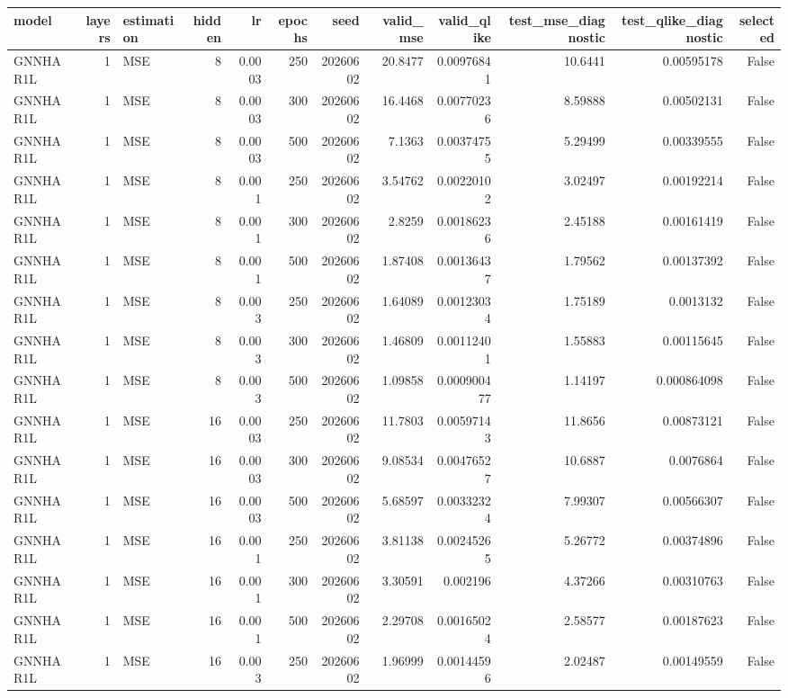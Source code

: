 \begin{tabular}{lrlrrrrrrrrr}
\toprule
model & layers & estimation & hidden & lr & epochs & seed & valid_mse & valid_qlike & test_mse_diagnostic & test_qlike_diagnostic & selected \\
\midrule
GNNHAR1L & 1 & MSE & 8 & 0.0003 & 250 & 20260602 & 20.8477 & 0.00976841 & 10.6441 & 0.00595178 & False \\
GNNHAR1L & 1 & MSE & 8 & 0.0003 & 300 & 20260602 & 16.4468 & 0.00770236 & 8.59888 & 0.00502131 & False \\
GNNHAR1L & 1 & MSE & 8 & 0.0003 & 500 & 20260602 & 7.1363 & 0.00374755 & 5.29499 & 0.00339555 & False \\
GNNHAR1L & 1 & MSE & 8 & 0.001 & 250 & 20260602 & 3.54762 & 0.00220102 & 3.02497 & 0.00192214 & False \\
GNNHAR1L & 1 & MSE & 8 & 0.001 & 300 & 20260602 & 2.8259 & 0.00186236 & 2.45188 & 0.00161419 & False \\
GNNHAR1L & 1 & MSE & 8 & 0.001 & 500 & 20260602 & 1.87408 & 0.00136437 & 1.79562 & 0.00137392 & False \\
GNNHAR1L & 1 & MSE & 8 & 0.003 & 250 & 20260602 & 1.64089 & 0.00123034 & 1.75189 & 0.0013132 & False \\
GNNHAR1L & 1 & MSE & 8 & 0.003 & 300 & 20260602 & 1.46809 & 0.00112401 & 1.55883 & 0.00115645 & False \\
GNNHAR1L & 1 & MSE & 8 & 0.003 & 500 & 20260602 & 1.09858 & 0.000900477 & 1.14197 & 0.000864098 & False \\
GNNHAR1L & 1 & MSE & 16 & 0.0003 & 250 & 20260602 & 11.7803 & 0.00597143 & 11.8656 & 0.00873121 & False \\
GNNHAR1L & 1 & MSE & 16 & 0.0003 & 300 & 20260602 & 9.08534 & 0.00476527 & 10.6887 & 0.0076864 & False \\
GNNHAR1L & 1 & MSE & 16 & 0.0003 & 500 & 20260602 & 5.68597 & 0.00332324 & 7.99307 & 0.00566307 & False \\
GNNHAR1L & 1 & MSE & 16 & 0.001 & 250 & 20260602 & 3.81138 & 0.00245265 & 5.26772 & 0.00374896 & False \\
GNNHAR1L & 1 & MSE & 16 & 0.001 & 300 & 20260602 & 3.30591 & 0.002196 & 4.37266 & 0.00310763 & False \\
GNNHAR1L & 1 & MSE & 16 & 0.001 & 500 & 20260602 & 2.29708 & 0.00165024 & 2.58577 & 0.00187623 & False \\
GNNHAR1L & 1 & MSE & 16 & 0.003 & 250 & 20260602 & 1.96999 & 0.00144596 & 2.02487 & 0.00149559 & False \\

\end{tabular}
